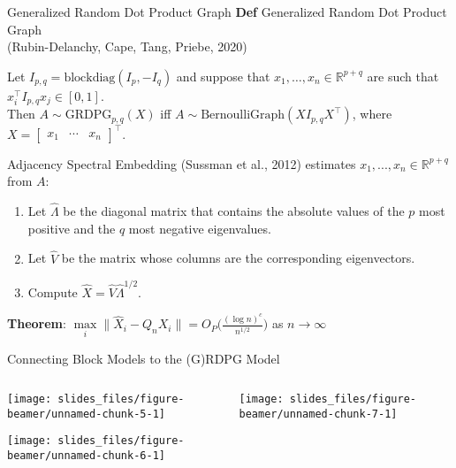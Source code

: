 \documentclass[
  ignorenonframetext,
]{beamer}
\providecommand{\tightlist}{%
  \setlength{\itemsep}{0pt}\setlength{\parskip}{0pt}}
\begin{document}
\begin{frame}{Generalized Random Dot Product Graph}
\protect\hypertarget{generalized-random-dot-product-graph}{}
\textbf{Def} Generalized Random Dot Product Graph\\
(Rubin-Delanchy, Cape, Tang, Priebe, 2020)

Let \(I_{p,q} = \text{blockdiag}(I_p, -I_q)\) and suppose that
\(x_1, \ldots, x_n \in \mathbb{R}^{p+q}\) are such that
\(x_i^\top I_{p,q} x_j \in [0,1]\).\\
Then \(A \sim \text{GRDPG}_{p, q}(X)\) iff
\(A \sim \text{BernoulliGraph}(X I_{p,q} X^\top)\), where
\(X = \begin{bmatrix} x_1 & \cdots & x_n \end{bmatrix}^\top\).

Adjacency Spectral Embedding (Sussman et al., 2012) estimates
\(x_1, ..., x_n \in \mathbb{R}^{p+q}\) from \(A\):

\begin{enumerate}
\tightlist
\item
  Let \(\hat{\Lambda}\) be the diagonal matrix that contains the
  absolute values of the \(p\) most positive and the \(q\) most negative
  eigenvalues.
\item
  Let \(\hat{V}\) be the matrix whose columns are the corresponding
  eigenvectors.
\item
  Compute \(\hat{X} = \hat{V} \hat{\Lambda}^{1/2}\).
\end{enumerate}

\textbf{Theorem}:
\(\max\limits_i \|\hat{X}_i - Q_n X_i \| = O_P \Big( \frac{(\log n)^c}{n^{1/2}} \Big)\)
as \(n \to \infty\)
\end{frame}

\begin{frame}{Connecting Block Models to the (G)RDPG Model}
\protect\hypertarget{connecting-block-models-to-the-grdpg-model}{}
\begin{columns}[T]
\begin{column}{0.48\textwidth}
\begin{center}\texttt{[image: slides\_files/figure-beamer/unnamed-chunk-5-1]} \end{center}

\vspace*{.5\baselineskip}

\begin{center}\texttt{[image: slides\_files/figure-beamer/unnamed-chunk-6-1]} \end{center}
\end{column}

\begin{column}{0.48\textwidth}
\vspace*{0\baselineskip}

\begin{center}\texttt{[image: slides\_files/figure-beamer/unnamed-chunk-7-1]} \end{center}
\end{column}
\end{columns}
\end{frame}
\end{document}
